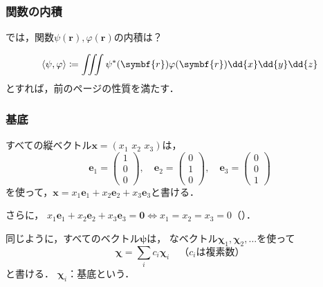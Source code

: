 \documentclass[
    10pt,
    ]{sotsu-beamer}
\begin{document}
\begin{frame}
    \frametitle{関数の内積}

    では，関数$\psi(\symbf{r}), \varphi(\symbf{r})$の内積は？

    \pause

    \begin{equation}
        \iparen{\psi, \varphi}
            \coloneq \iiint \conj{\psi}(\symbf{r}) \varphi(\symbf{r}) \dd{x} \dd{y} \dd{z}
    \end{equation}
    とすれば，前のページの性質を満たす．

\end{frame}


\begin{frame}
    \frametitle{基底}

    すべての縦ベクトル$\symbf{x} = (x_1 \,\, x_2 \,\, x_3)$は，
    \begin{equation}
        \label{eq:Euclidean-basis}
        \symbf{e}_1 = \begin{pmatrix} 1 \\ 0 \\ 0 \end{pmatrix}, \quad 
        \symbf{e}_2 = \begin{pmatrix} 0 \\ 1 \\ 0 \end{pmatrix}, \quad 
        \symbf{e}_3 = \begin{pmatrix} 0 \\ 0 \\ 1 \end{pmatrix}
    \end{equation}
    を使って，$\symbf{x} = x_1 \symbf{e}_1 + x_2 \symbf{e}_2 + x_3 \symbf{e}_3$と書ける．

    さらに，
    \begin{math}
        x_1 \symbf{e}_1 + x_2 \symbf{e}_2 + x_3 \symbf{e}_3 = \symbf{0}
        \iff
        x_1 = x_2 = x_3 = 0
    \end{math}（）．

    \pause

    同じように，\alert{すべてのベクトル}$\symbf{\psi}$は，
    なベクトル$\symbf{\chi}_1, \symbf{\chi}_2, \dotsc$を使って
    \begin{equation}
        \label{eq:basis}
        \symbf{\chi} = \sum_i c_i \symbf{\chi}_i
        \quad \text{（$c_i$は複素数）}
    \end{equation}
    と書ける．
    \pause
    $\symbf{\chi}_i$：\alert{基底}という．

\end{frame}
\end{document}
